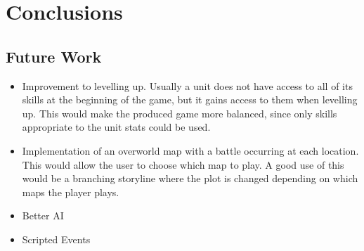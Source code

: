 \section{Conclusions}


\subsection{Future Work}
\begin{itemize}
\item Improvement to levelling up. 
	Usually a unit does not have access to all of its skills at the beginning of the game, but it gains access to them when levelling up.  This would make the produced game  more balanced, since only skills appropriate to the unit stats could be used.

\item Implementation of an overworld map with a battle occurring at each location. This would allow the user to choose which map to play.  A good use of this would be a branching storyline where the plot is changed depending on which maps the player plays.
 
\item  Better AI

\item Scripted Events

\end{itemize}


